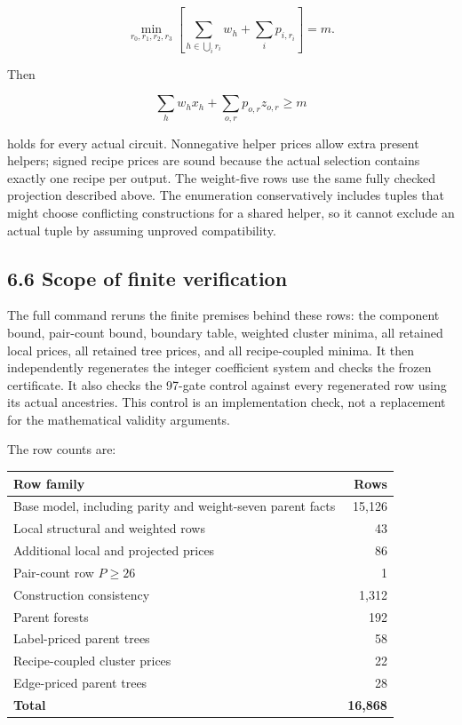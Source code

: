 \[\min_{r_0,r_1,r_2,r_3}\left[\sum_{h\in\bigcup_i r_i}w_h+\sum_i p_{i,r_i}\right]=m.\]

Then

\[\sum_h w_hx_h+\sum_{o,r}p_{o,r}z_{o,r}\geq m\]

holds for every actual circuit. Nonnegative helper prices allow extra present helpers; signed recipe prices are sound because the actual selection contains exactly one recipe per output. The weight-five rows use the same fully checked projection described above. The enumeration conservatively includes tuples that might choose conflicting constructions for a shared helper, so it cannot exclude an actual tuple by assuming unproved compatibility.

\hypertarget{scope-of-finite-verification}{%
\subsection{6.6 Scope of finite verification}\label{scope-of-finite-verification}}

The full command reruns the finite premises behind these rows: the component bound, pair-count bound, boundary table, weighted cluster minima, all retained local prices, all retained tree prices, and all recipe-coupled minima. It then independently regenerates the integer coefficient system and checks the frozen certificate. It also checks the 97-gate control against every regenerated row using its actual ancestries. This control is an implementation check, not a replacement for the mathematical validity arguments.

The row counts are:

\begin{longtable}[]{@{}lr@{}}
\toprule\noalign{}
Row family & Rows \\
\midrule\noalign{}
\endhead
\bottomrule\noalign{}
\endlastfoot
Base model, including parity and weight-seven parent facts & 15,126 \\
Local structural and weighted rows & 43 \\
Additional local and projected prices & 86 \\
Pair-count row \(P\geq26\) & 1 \\
Construction consistency & 1,312 \\
Parent forests & 192 \\
Label-priced parent trees & 58 \\
Recipe-coupled cluster prices & 22 \\
Edge-priced parent trees & 28 \\
\textbf{Total} & \textbf{16,868} \\
\end{longtable}

